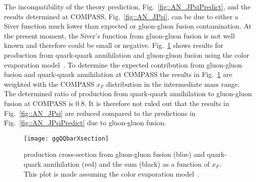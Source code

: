 The incompatibility of the theory prediction, Fig.~\ref{fig::AN_JPsiPredict},
and the results determined at COMPASS, Fig.~\ref{fig::AN_JPsi}, can be due to
either a Siver function much lower than expected or gluon-gluon fusion
contamination.  At the present moment, the Siver's function from gluon-gluon
fusion is not well known and therefore could be small or negative.
Fig.~\ref{fig::ggQQbarXsection} shows results for {\jp} production from
quark-quark annihilation and gluon-gluon fusion using the color evaporation
model~\cite{VOGT1999197}.  To determine the expected {\jp} contribution from
gluon-gluon fusion and quark-quark annihilation at COMPASS the results in
Fig.~\ref{fig::ggQQbarXsection} are weighted with the COMPASS $x_F$ distribution
in the intermediate mass range.  The determined ratio of {\jp} production from
quark-quark annihilation to gluon-gluon fusion at COMPASS is 0.8.  It is
therefore not ruled out that the results in Fig.~\ref{fig::AN_JPsi} are reduced
compared to the predictions in Fig.~\ref{fig::AN_JPsiPredict} due to gluon-gluon
fusion.

\begin{figure}[h!t]
  \centering \texttt{[image: ggQQbarXsection]}
  \caption{{\jp} production cross-section from gluon-gluon fusion (blue) and
    quark-quark annihilation (red) and the sum (black) as a function of $x_F$.
    This plot is made assuming the color evaporation model~\cite{VOGT1999197}. }
  \label{fig::ggQQbarXsection}
\end{figure}
